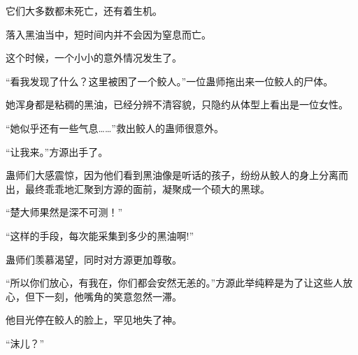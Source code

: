 \begin{this_body}
它们大多数都未死亡，还有着生机。

落入黑油当中，短时间内并不会因为窒息而亡。

这个时候，一个小小的意外情况发生了。

“看我发现了什么？这里被困了一个鲛人。”一位蛊师拖出来一位鲛人的尸体。

她浑身都是粘稠的黑油，已经分辨不清容貌，只隐约从体型上看出是一位女性。

“她似乎还有一些气息……”救出鲛人的蛊师很意外。

“让我来。”方源出手了。

蛊师们大感震惊，因为他们看到黑油像是听话的孩子，纷纷从鲛人的身上分离而出，最终乖乖地汇聚到方源的面前，凝聚成一个硕大的黑球。

“楚大师果然是深不可测！”

“这样的手段，每次能采集到多少的黑油啊!”

蛊师们羡慕渴望，同时对方源更加尊敬。

“所以你们放心，有我在，你们都会安然无恙的。”方源此举纯粹是为了让这些人放心，但下一刻，他嘴角的笑意忽然一滞。

他目光停在鲛人的脸上，罕见地失了神。

“沫儿？”

\end{this_body}

